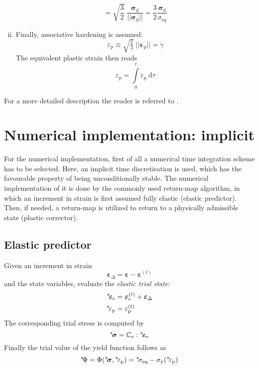 \documentclass[times]{goose-article}
\newcommand\leftstar[1]{\hspace*{-.3em}~^\star\!#1}
\begin{document}
\begin{enumerate}[(i)]
\begin{equation}
  = \sqrt{\frac{3}{2}} \;
    \frac{\bm{\sigma}_\mathrm{d}}{|| \bm{\sigma}_\mathrm{d} ||}
  = \frac{3}{2}
    \frac{\bm{\sigma}_\mathrm{d}}{\sigma_\mathrm{eq}}
\end{equation}
\item Finally, associative hardening is assumed:
\begin{equation}
  \dot{\varepsilon}_\mathrm{p}
  \equiv \sqrt{\tfrac{2}{3}} \; \big|\big| \dot{\bm{\varepsilon}}_\mathrm{p} \big|\big|
  = \dot{\gamma}
\end{equation}
The equivalent plastic strain then reads
\begin{equation}
  \varepsilon_\mathrm{p} =
  \int\limits_0^t \dot{\varepsilon}_\mathrm{p} ~\mathrm{d}\tau
\end{equation}
\end{enumerate}
For a more detailed description the reader is referred to \citet[][p.\ 216-234]{DeSouzaNeto2008}.

\section{Numerical implementation: implicit}

For the numerical implementation, first of all a numerical time integration scheme has to be selected. Here, an implicit time discretisation is used, which has the favourable property of being unconditionally stable. The numerical implementation of it is done by the commonly used return-map algorithm, in which an increment in strain is first assumed fully elastic (elastic predictor). Then, if needed, a return-map is utilized to return to a physically admissible state (plastic corrector).

\subsection{Elastic predictor}

Given an increment in strain
\begin{equation}
  \bm{\varepsilon}_\Delta
  = \bm{\varepsilon} - \bm{\varepsilon}^{(t)}
\end{equation}
and the state variables, evaluate the \emph{elastic trial state}:
\begin{align}
  \leftstar{\bm{\varepsilon}}_\mathrm{e}
  &= \bm{\varepsilon}_\mathrm{e}^{(t)} + \bm{\varepsilon}_\Delta
  \\
  \leftstar{\varepsilon}_\mathrm{p}
  &= \varepsilon_\mathrm{p}^{(t)}
\end{align}
The corresponding trial stress is computed by
\begin{equation}
  \leftstar{\bm{\sigma}}
  = \mathbb{C}_\mathrm{e} : \leftstar{\bm{\varepsilon}}_\mathrm{e}
\end{equation}
Finally the trial value of the yield function follows as
\begin{equation}
  \leftstar{\Phi}
  = \Phi( \leftstar{\bm{\sigma}} , \leftstar{\varepsilon}_\mathrm{p} )
  = \leftstar{\sigma}_\mathrm{eq}
  - \sigma_\mathrm{y} (\leftstar{\varepsilon}_\mathrm{p})
\end{equation}
\end{document}

